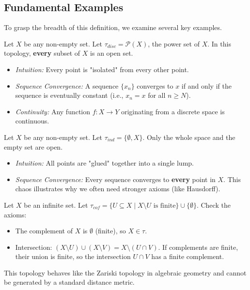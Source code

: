 \subsection{Fundamental Examples}

To grasp the breadth of this definition, we examine several key examples.

\begin{example}
Let $X$ be any non-empty set. Let $\tau_{disc} = \mathcal{P}(X)$, the power set of $X$.
In this topology, \textbf{every} subset of $X$ is an open set.
\begin{itemize}
    \item \textit{Intuition:} Every point is "isolated" from every other point.
    \item \textit{Sequence Convergence:} A sequence $\{x_n\}$ converges to $x$ if and only if the sequence is eventually constant (i.e., $x_n = x$ for all $n \ge N$).
    \item \textit{Continuity:} Any function $f: X \to Y$ originating from a discrete space is continuous.
\end{itemize}
\end{example}

\begin{example}
Let $X$ be any non-empty set. Let $\tau_{ind} = \{\emptyset, X\}$.
Only the whole space and the empty set are open.
\begin{itemize}
    \item \textit{Intuition:} All points are "glued" together into a single lump.
    \item \textit{Sequence Convergence:} Every sequence converges to \textbf{every} point in $X$. This chaos illustrates why we often need stronger axioms (like Hausdorff).
\end{itemize}
\end{example}

\newpage

\begin{example}
Let $X$ be an infinite set. Let $\tau_{cof} = \{ U \subseteq X \mid X \setminus U \text{ is finite} \} \cup \{ \emptyset \}$.
Check the axioms:
\begin{itemize}
    \item The complement of $X$ is $\emptyset$ (finite), so $X \in \tau$.
    \item Intersection: $(X \setminus U) \cup (X \setminus V) = X \setminus (U \cap V)$. If complements are finite, their union is finite, so the intersection $U \cap V$ has a finite complement.
\end{itemize}
This topology behaves like the Zariski topology in algebraic geometry and cannot be generated by a standard distance metric.
\end{example}

